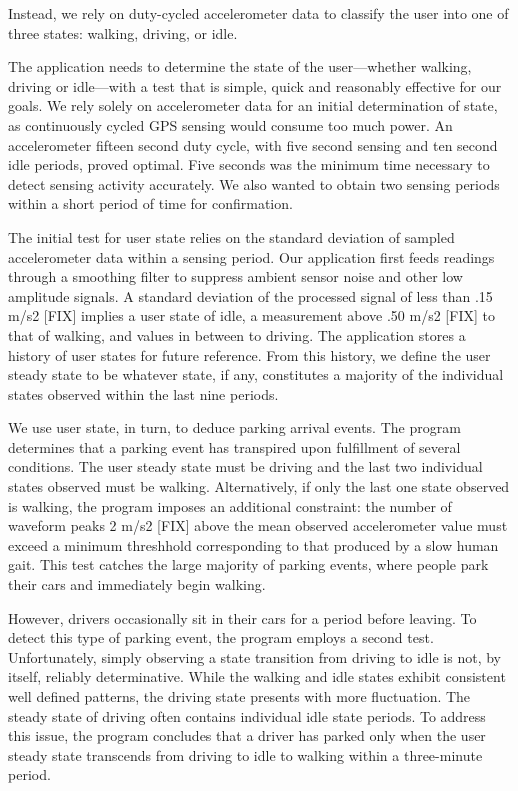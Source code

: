 Instead, we rely on duty-cycled accelerometer data to classify the user into
one of three states: walking, driving, or idle.

The application needs to determine the state of the user---whether walking,
driving or idle---with a test that is simple, quick and reasonably effective
for our goals.  We rely solely on accelerometer data for an initial
determination of state, as continuously cycled GPS sensing would consume too
much power.  An accelerometer fifteen second duty cycle, with five second
sensing and ten second idle periods, proved optimal.  Five seconds was the
minimum time necessary to detect sensing activity accurately.  We also wanted
to obtain two sensing periods within a short period of time for confirmation.

The initial test for user state relies on the standard deviation of sampled
accelerometer data within a sensing period.  Our application first feeds
readings through a smoothing filter to suppress ambient sensor noise
and other low amplitude signals.  A standard deviation of the processed
signal of less than .15 m/s2 [FIX] implies a user state of idle, a measurement
above .50 m/s2 [FIX] to that of walking, and values in between to driving. The
application stores a history of user states for future reference.  From this
history, we define the user steady state to be whatever state, if any,
constitutes a majority of the individual states observed within the last
nine periods.

We use user state, in turn, to deduce parking arrival events. The program
determines that a parking event has transpired upon fulfillment of several
conditions.  The user steady state must be driving and the last two
individual states observed must be walking.  Alternatively, if only the last
one state observed is walking, the program imposes an additional constraint:
the number of waveform peaks 2 m/s2 [FIX] above the mean observed
accelerometer value must exceed a minimum threshhold corresponding to that
produced by a slow human gait.  This test catches the large majority of
parking events, where people park their cars and immediately begin walking.

However, drivers occasionally sit in their cars for a period before leaving.
To detect this type of parking event, the program employs a second test.
Unfortunately, simply observing a state transition from driving to idle is
not, by itself, reliably determinative.  While the walking and idle states
exhibit consistent well defined patterns, the driving state presents with
more fluctuation.  The steady state of driving often contains individual
idle state periods.  To address this issue, the program concludes that a
driver has parked only when the user steady state transcends from driving to
idle to walking within a three-minute period.

